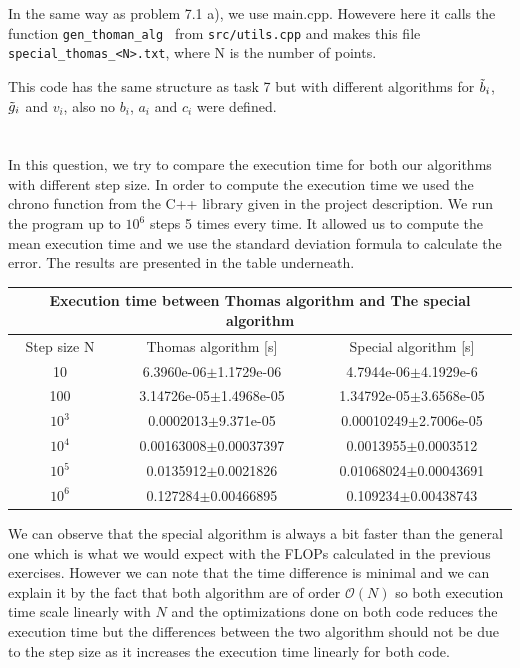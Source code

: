 \documentclass[a4paper,10pt,english]{article}
\begin{document}
			In the same way as problem 7.1 a), we use main.cpp. Howevere here it calls the function \verb|gen_thoman_alg | from \verb|src/utils.cpp| and makes this file \verb|special_thomas_<N>.txt|, where N is the number of points.
			
			This code has the same structure as task 7 but with different algorithms for $\Tilde{b}_i$, $\Tilde{g}_i$ and $v_i$, also no $b_i$, $a_i$ and $c_i$ were defined.
			
			\section{} %
			
			In this question, we try to compare the execution time for both our algorithms with different step size. In order to compute the execution time we used the chrono function from the C++ library given in the project description. We run the program up to $10^6$ steps 5 times every time. It allowed us to compute the mean execution time and we use the standard deviation formula to calculate the error. The results are presented in the table underneath. 
			
			
			\begin{tabular}{ |c||c|c|}
				\hline
				\multicolumn{3}{|c|}{Execution time between Thomas algorithm and The special algorithm} \\
				\hline
				Step size N & Thomas algorithm [s] &Special algorithm [s] \\
				\hline
				10     &  6.3960e-06$\pm$1.1729e-06   & 4.7944e-06$\pm$4.1929e-6	\\
				100    &  3.14726e-05$\pm$1.4968e-05& 1.34792e-05$\pm$3.6568e-05     \\
				$10^3$ &0.0002013$\pm$9.371e-05		 & 0.00010249$\pm$2.7006e-05\\
				$10^4$ &0.00163008$\pm$0.00037397        & 0.0013955$\pm$0.0003512 \\
				$10^5$ &  0.0135912$\pm$0.0021826      & 0.01068024$\pm$0.00043691 \\
				$10^6$ & 0.127284$\pm$0.00466895      & 0.109234$\pm$0.00438743 \\
				\hline
			\end{tabular}
			
			We can observe that the special algorithm is always a bit faster than the general one which is what we would expect with the FLOPs calculated in the previous exercises. However we can note that the time difference is minimal and we can explain it by the fact that both algorithm are of order $\mathcal{O}(N)$ so both execution time scale linearly with $N$ and the optimizations done on both code reduces the execution time but the differences between the two algorithm should not be due to the step size as it increases the execution time linearly for both code.
			
		
\end{document}
